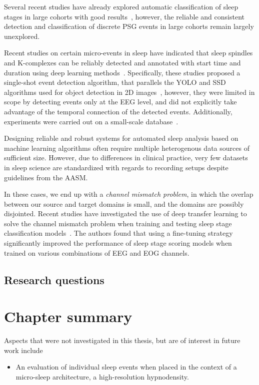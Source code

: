 Several recent studies have already explored automatic classification of sleep stages in large cohorts with good results~\cite{Olesen2018,Stephansen2018,Chambon2018a,Biswal2018, Phan2018}, however, the reliable and consistent detection and classification of discrete PSG events in large cohorts remain largely unexplored. 

Recent studies on certain micro-events in sleep have indicated that sleep spindles and K-complexes can be reliably detected and annotated with start time and duration using deep learning methods~\cite{Chambon2018b,Chambon2019}. 
Specifically, these studies proposed a single-shot event detection algorithm, that parallels the YOLO and SSD algorithms used for object detection in 2D images~\cite{Redmon2016,Liu2016}, however, they were limited in scope by detecting events only at the \ac{EEG} level, and did not explicitly take advantage of the temporal connection of the detected events. 
Additionally, experiments were carried out on a small-scale database~\cite{Chambon2018b}. 

Designing reliable and robust systems for automated sleep analysis based on machine learning algorithms often require multiple heterogenous data sources of sufficient size.
However, due to differences in clinical practice, very few datasets in sleep science are standardized with regards to recording setups despite guidelines from the \ac{AASM}.

In these cases, we end up with a \textit{channel mismatch problem}, in which the overlap between our source and target domains is small, and the domains are possibly disjointed. 
Recent studies have investigated the use of deep transfer learning to solve the channel mismatch problem when training and testing sleep stage classification models~\cite{Phan2019, Phan2019c}.
The authors found that using a fine-tuning strategy significantly improved the performance of sleep stage scoring models when trained on various combinations of \ac{EEG} and \ac{EOG} channels.

\subsection{Research questions}



% 

\section{Chapter summary}\label{sec:eventdetection-summary}

Aspects that were not investigated in this thesis, but are of interest in future work include
\begin{itemize}
    \item An evaluation of individual sleep events when placed in the context of a micro-sleep architecture, \eg a high-resolution hypnodensity.
\end{itemize}